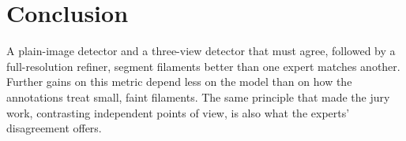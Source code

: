 \documentclass[conference]{IEEEtran}
\begin{document}
\section{Conclusion}
A plain-image detector and a three-view detector that must agree, followed by a full-resolution refiner,
segment filaments better than one expert matches another. Further gains on this metric depend less on the
model than on how the annotations treat small, faint filaments. The same principle that made the jury work,
contrasting independent points of view, is also what the experts' disagreement offers.
\end{document}
